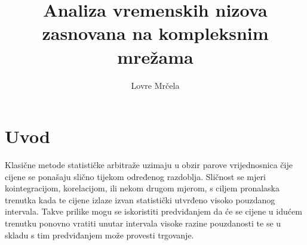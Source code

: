 \documentclass[lmodern, utf8, diplomski, numeric]{fer}
\begin{document}

\title{Analiza vremenskih nizova zasnovana na kompleksnim mrežama}

\author{Lovre Mrčela}

\maketitle



\tableofcontents

\chapter{Uvod}
  Klasične metode statističke arbitraže uzimaju u obzir parove vrijednosnica čije cijene se ponašaju slično tijekom određenog razdoblja.
  Sličnost se mjeri kointegracijom, korelacijom, ili nekom drugom mjerom, s ciljem pronalaska trenutka kada te cijene izlaze izvan statistički utvrđeno visoko pouzdanog intervala.
  Takve prilike mogu se iskoristiti predviđanjem da će se cijene u idućem trenutku ponovno vratiti unutar intervala visoke razine pouzdanosti te se u skladu s tim predviđanjem može provesti trgovanje.
  
\end{document}

